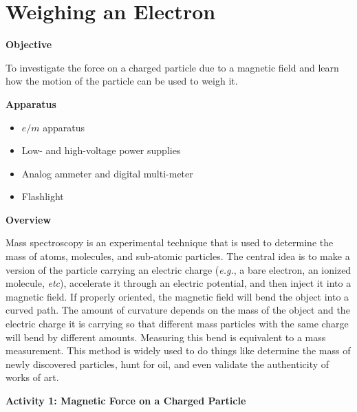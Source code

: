 \setcounter{equation}{0}
\setcounter{figure}{0}

\section{Weighing an Electron}

\makelabheader %


\textbf{Objective}

To investigate the force on a charged particle due to a magnetic field and 
learn how the motion of the particle can be used to weigh it.

\textbf{Apparatus}

\begin{itemize}

\item $e/m$ apparatus

\item Low- and high-voltage power supplies

\item Analog ammeter and digital multi-meter

\item Flashlight

\end{itemize}

\textbf{Overview}

Mass spectroscopy is an experimental technique that is used to determine
the mass of atoms, molecules, and sub-atomic particles.
The central idea is to make a version of the particle carrying an electric
charge ({\it e.g.}, a bare electron, an ionized molecule, {\it etc}), accelerate it
through an electric potential, and then inject it into a magnetic field.
If properly oriented, the magnetic field will bend the object into
a curved path.
The amount of curvature depends on the mass of the object and the electric
charge it is carrying so that different mass particles with the same charge will
bend by different amounts.
Measuring this bend is equivalent to a mass measurement.
This method is widely used to do things like determine the mass of newly discovered particles,
hunt for oil, and even validate the authenticity of works of art.

\textbf{Activity 1: Magnetic Force on a Charged Particle}

